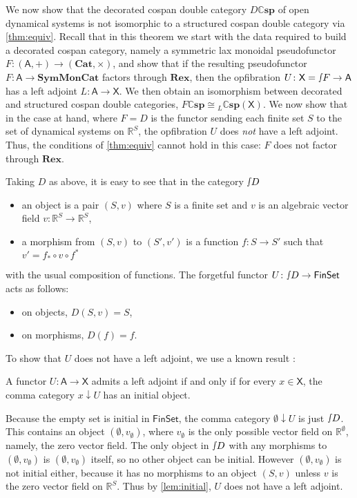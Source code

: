 \documentclass[ a4paper, onecolumn, superscriptaddress,10pt, accepted=2022-02-14, issue=3, volume=4, shorttitle=papers/compositionality-4-3 ]{compositionalityarticle}
\newcommand{\R}{\mathbb{R}}
\let\maps\colon
\newcommand{\Set}{\mathsf{Set}}
\newcommand{\A}{\mathsf{A}}
\newcommand{\X}{\mathsf{X}}
\newcommand{\Fin}{\mathsf{Fin}}
\newcommand{\bicat}{\mathbf}
\newcommand{\Cat}{\bicat{Cat}}
\newcommand{\Rex}{\bicat{Rex}}
\newcommand{\SMC}{\bicat{SymMonCat}}
\newcommand{\double}[1]{\mathbf{\mathbb #1}}
\newcommand{\lCsp}{\double{Csp}}
\newcommand{\inta}{\raisebox{.3\depth}{$\smallint\hspace{-.01in}$}}
\begin{document}
We now show that the decorated cospan double category $D \lCsp$ of open dynamical systems is not isomorphic to a structured cospan double category via \cref{thm:equiv}. Recall that in this theorem we start with the data required to build a decorated cospan category, namely a symmetric lax monoidal pseudofunctor $F \maps (\A,+) \to (\Cat,\times)$, and show that if the resulting pseudofunctor $F \maps \A \to \SMC$ factors through $\Rex$, then the opfibration $U \maps \X = \inta F \to \A$ has a left adjoint $L \maps \A \to \X$. We then obtain an isomorphism between decorated and structured cospan double categories, $F \lCsp \cong {}_L \lCsp(\X)$. We now show that in the case at hand, where $F = D$ is the functor sending each finite set $S$ to the set of dynamical systems on $\R^S$, the opfibration $U$ does \emph{not} have a left adjoint. Thus, the conditions of \cref{thm:equiv} cannot hold in this case: $F$ does not factor through $\Rex$.

Taking $D$ as above, it is easy to see that in the category $\inta D$
\begin{itemize}
\item an object is a pair $(S,v)$ where $S$ is a finite set and $v$ is an algebraic vector field $v \maps \R^S \to \R^S$,
\item a morphism from $(S,v)$ to $(S',v')$ is a function $f \maps S \to S'$ such that $v' = f_* \circ v \circ f^*$
\end{itemize}
with the usual composition of functions.   The forgetful functor $U \maps \inta D \to \Fin\Set$ acts as follows:
\begin{itemize}
\item on objects, $D(S,v) = S$,
\item on morphisms, $D(f) = f$.
\end{itemize}

To show that $U$ does not have a left adjoint, we use a known result \cite[Lemma 4.6.1]{Riehl}:
\begin{lem} \label{lem:initial}
A functor $U \maps \A \to \X$ admits a left adjoint if and only if for every $x \in \X$, the comma category $x \downarrow U$ has an initial object.
\end{lem}
Because the empty set is initial in $\Fin\Set$, the comma category
$\emptyset \downarrow U$ is just $\inta D$.  This contains an object $(\emptyset, v_\emptyset)$, where $v_\emptyset$ is the only possible vector field on $\R^\emptyset$, namely, the zero vector field.   The only object in $\inta D$ with any morphisms to $(\emptyset, v_\emptyset)$ is $(\emptyset, v_\emptyset)$ itself, so no other object can be initial.  However $(\emptyset, v_\emptyset)$ is not initial either, because it has no morphisms to an object $(S,v)$ unless $v$ is the zero vector field on $\R^S$.  Thus by \cref{lem:initial}, $U$ does not have a left adjoint.
\end{document}
